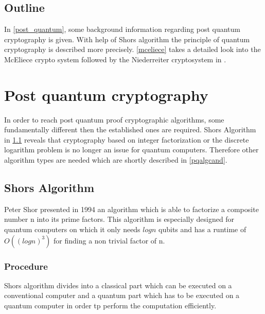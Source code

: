 \subsection*{Outline}
In \autoref{post_quantum}, some background information regarding post quantum cryptography is given. With help of Shors algorithm the principle of quantum cryptography is described more precisely. \autoref{mceliece} takes a detailed look into the McEliece crypto system followed by the Niederreiter cryptosystem in . 


\section{Post quantum cryptography}
\label{post_quantum}
In order to reach post quantum proof cryptographic algorithms, some fundamentally different then the established ones are required. Shors Algorithm in \ref{shoor} reveals that cryptography based on integer factorization or the discrete logarithm problem is no longer an issue for quantum computers. Therefore other algorithm types are needed which are shortly described in \ref{pqalgcand}.   

\subsection{Shors Algorithm}
\label{shoor}
Peter Shor presented in 1994 an algorithm which is able to factorize a composite number n into its prime factors. This algorithm is especially designed for quantum computers on which it only needs $log n$ qubits and has a runtime of $O((log n)^3)$ for finding a non trivial factor of n. 

\subsubsection{Procedure}
Shors algorithm divides into a classical part which can be executed on a conventional computer and a quantum part which has to be executed on a quantum computer in order tp perform the computation efficiently. 

